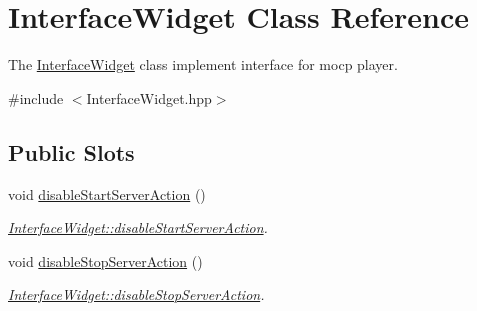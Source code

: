 \hypertarget{class_interface_widget}{\section{\-Interface\-Widget \-Class \-Reference}
\label{class_interface_widget}
}


\-The \hyperlink{class_interface_widget}{\-Interface\-Widget} class implement interface for mocp player.  




{\ttfamily \#include $<$\-Interface\-Widget.\-hpp$>$}

\subsection*{\-Public \-Slots}
\begin{DoxyCompactItemize}
\item 
void \hyperlink{class_interface_widget_a6fb283827577dfa71183a2a64fff7480}{disable\-Start\-Server\-Action} ()
\begin{DoxyCompactList}\small\item\em \hyperlink{class_interface_widget_a6fb283827577dfa71183a2a64fff7480}{\-Interface\-Widget\-::disable\-Start\-Server\-Action}. \end{DoxyCompactList}\item 
void \hyperlink{class_interface_widget_a591b5f123431b60db0bd916214c82cb3}{disable\-Stop\-Server\-Action} ()
\begin{DoxyCompactList}\small\item\em \hyperlink{class_interface_widget_a591b5f123431b60db0bd916214c82cb3}{\-Interface\-Widget\-::disable\-Stop\-Server\-Action}. \end{DoxyCompactList}\end{DoxyCompactItemize}
